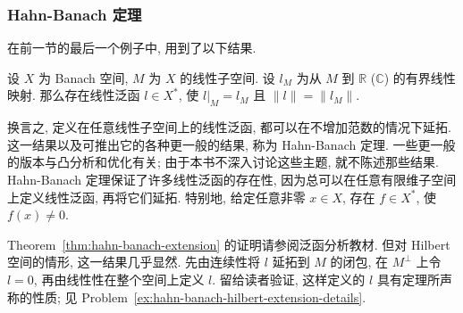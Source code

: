 \subsubsection{Hahn-Banach 定理}\label{subsec:hahn-banach-theorem}

在前一节的最后一个例子中, 用到了以下结果.

\begin{Theorem}
\label{thm:hahn-banach-extension}
设 $X$ 为 Banach 空间, $M$ 为 $X$ 的线性子空间. 设 $l_M$ 为从 $M$ 到 $\mathbb{R}$ ($\mathbb{C}$) 的有界线性映射. 那么存在线性泛函 $l\in X^*$, 使 $l|_M=l_M$ 且 $\|l\|=\|l_M\|$.
\end{Theorem}

换言之, 定义在任意线性子空间上的线性泛函, 都可以在不增加范数的情况下延拓. 这一结果以及可推出它的各种更一般的结果, 称为 Hahn-Banach 定理. 一些更一般的版本与凸分析和优化有关; 由于本书不深入讨论这些主题, 就不陈述那些结果. Hahn-Banach 定理保证了许多线性泛函的存在性, 因为总可以在任意有限维子空间上定义线性泛函, 再将它们延拓. 特别地, 给定任意非零 $x\in X$, 存在 $f\in X^*$, 使 $f(x)\ne0$.

Theorem~\ref{thm:hahn-banach-extension} 的证明请参阅泛函分析教材. 但对 Hilbert 空间的情形, 这一结果几乎显然. 先由连续性将 $l$ 延拓到 $M$ 的闭包, 在 $M^\perp$ 上令 $l=0$, 再由线性性在整个空间上定义 $l$. 留给读者验证, 这样定义的 $l$ 具有定理所声称的性质; 见 Problem~\ref{ex:hahn-banach-hilbert-extension-details}.
